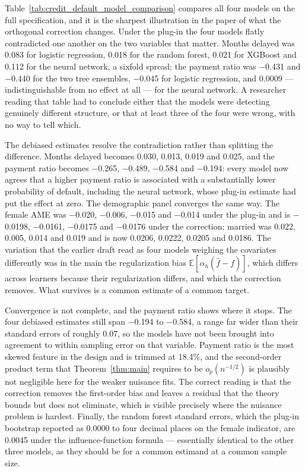 \documentclass[12pt]{article}
\newcommand{\E}{\mathbb{E}}
\begin{document}
	Table~\ref{tab:credit_default_model_comparison} compares all four models on the full specification, and it is the sharpest illustration in the paper of what the orthogonal correction changes. Under the plug-in the four models flatly contradicted one another on the two variables that matter. Months delayed was 0.083 for logistic regression, 0.018 for the random forest, 0.021 for XGBoost and 0.112 for the neural network, a sixfold spread; the payment ratio was $-$0.431 and $-$0.440 for the two tree ensembles, $-$0.045 for logistic regression, and 0.0009 --- indistinguishable from no effect at all --- for the neural network. A researcher reading that table had to conclude either that the models were detecting genuinely different structure, or that at least three of the four were wrong, with no way to tell which.

	The debiased estimates resolve the contradiction rather than splitting the difference. Months delayed becomes 0.030, 0.013, 0.019 and 0.025, and the payment ratio becomes $-$0.265, $-$0.489, $-$0.584 and $-$0.194: every model now agrees that a higher payment ratio is associated with a substantially lower probability of default, including the neural network, whose plug-in estimate had put the effect at zero. The demographic panel converges the same way. The female AME was $-$0.020, $-$0.006, $-$0.015 and $-$0.014 under the plug-in and is $-$0.0198, $-$0.0161, $-$0.0175 and $-$0.0176 under the correction; married was 0.022, 0.005, 0.014 and 0.019 and is now 0.0206, 0.0222, 0.0205 and 0.0186. The variation that the earlier draft read as four models weighing the covariates differently was in the main the regularization bias $\E[\alpha_h(\hat f - f)]$, which differs across learners because their regularization differs, and which the correction removes. What survives is a common estimate of a common target.

	Convergence is not complete, and the payment ratio shows where it stops. The four debiased estimates still span $-$0.194 to $-$0.584, a range far wider than their standard errors of roughly 0.07, so the models have not been brought into agreement to within sampling error on that variable. Payment ratio is the most skewed feature in the design and is trimmed at 18.4\%, and the second-order product term that Theorem~\ref{thm:main} requires to be $o_p(n^{-1/2})$ is plausibly not negligible here for the weaker nuisance fits. The correct reading is that the correction removes the first-order bias and leaves a residual that the theory bounds but does not eliminate, which is visible precisely where the nuisance problem is hardest. Finally, the random forest standard errors, which the plug-in bootstrap reported as 0.0000 to four decimal places on the female indicator, are 0.0045 under the influence-function formula --- essentially identical to the other three models, as they should be for a common estimand at a common sample size.
	
\end{document}
